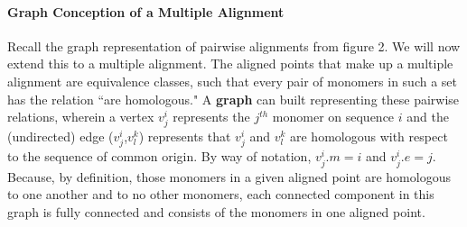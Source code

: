 \documentclass[11pt]{article}
\begin{document}
\paragraph{Graph Conception of a Multiple Alignment\newline}
\par{
Recall the graph representation of pairwise alignments from figure 2.  We will now extend this to a multiple alignment.  The aligned points that make up a multiple alignment are equivalence classes, such that every pair of monomers in such a set has the relation ``are homologous." A \textbf{graph} can built representing these pairwise relations, wherein a vertex $v^{i}_j$ represents the $j^{th}$ monomer on sequence $i$ and the (undirected) edge ($v^{i}_j$,$v^k_l$) represents that $v^i_j$ and $v^k_l$ are homologous with respect to the sequence of common origin.  By way of notation, $v^i_j.m = i$ and $v^i_j.e = j$.  Because, by definition, those monomers in a given aligned point are homologous to one another and to no other monomers, each connected component in this graph is fully connected and consists of the monomers in one aligned point.\cite{Corel}
}
\end{document}
